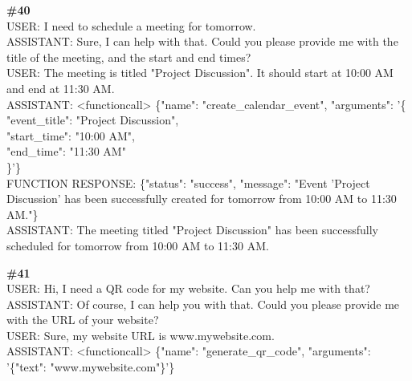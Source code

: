 \documentclass[10pt]{article}
\begin{document}
\begin{Form}
\vspace{8pt}
\begin{tcolorbox}[colback=convbg,colframe=itemframe,boxrule=0.8pt,arc=2pt,breakable,left=6pt,right=6pt,top=5pt,bottom=5pt]
{\footnotesize\textbf{\#40}}\\[3pt]
{\footnotesize USER: I need to schedule a meeting for tomorrow. \\[2pt]
ASSISTANT: Sure, I can help with that. Could you please provide me with the title of the meeting, and the start and end times?   \\[2pt]
USER: The meeting is titled "Project Discussion". It should start at 10:00 AM and end at 11:30 AM. \\[2pt]
ASSISTANT: <functioncall> \{"name": "create\_calendar\_event", "arguments": '\{ \\[2pt]
"event\_title": "Project Discussion", \\[2pt]
"start\_time": "10:00 AM", \\[2pt]
"end\_time": "11:30 AM" \\[2pt]
\}'\}   \\[2pt]
FUNCTION RESPONSE: \{"status": "success", "message": "Event 'Project Discussion' has been successfully created for tomorrow from 10:00 AM to 11:30 AM."\} \\[2pt]
ASSISTANT: The meeting titled "Project Discussion" has been successfully scheduled for tomorrow from 10:00 AM to 11:30 AM.  }
\end{tcolorbox}
\vspace{-1pt}
\CheckBox[name=q40c,width=1.6ex,height=1.6ex,bordercolor={0.45 0.45 0.45}]{~\textcolor{cbox}{COMPACT}}\quad
\CheckBox[name=q40d,width=1.6ex,height=1.6ex,bordercolor={0.45 0.45 0.45}]{~\textcolor{dbox}{DIFFUSE}}\quad
\CheckBox[name=q40n,width=1.6ex,height=1.6ex,bordercolor={0.45 0.45 0.45}]{~\textcolor{nbox}{NONE}}
\vspace{8pt}
\begin{tcolorbox}[colback=convbg,colframe=itemframe,boxrule=0.8pt,arc=2pt,breakable,left=6pt,right=6pt,top=5pt,bottom=5pt]
{\footnotesize\textbf{\#41}}\\[3pt]
{\footnotesize USER: Hi, I need a QR code for my website. Can you help me with that? \\[2pt]
ASSISTANT: Of course, I can help you with that. Could you please provide me with the URL of your website?   \\[2pt]
USER: Sure, my website URL is www.mywebsite.com. \\[2pt]
ASSISTANT: <functioncall> \{"name": "generate\_qr\_code", "arguments": '\{"text": "www.mywebsite.com"\}'\}   \\[2pt]
}
\end{tcolorbox}
\end{Form}
\end{document}
